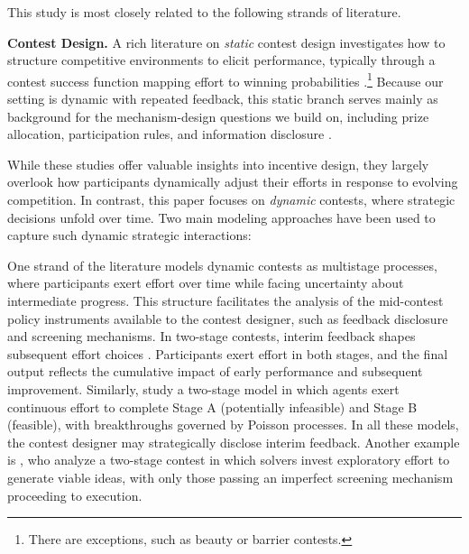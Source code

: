 \documentclass[mnsc]{informs3}
\begin{document}
This study is most closely related to the following strands of literature.

\textbf{Contest Design.}
A rich literature on \textit{static} contest design \citep{ales2017optimal_award} investigates how to structure competitive environments to elicit performance, typically through a contest success function mapping effort to winning probabilities \citep{skaperdas1996contest}.\footnote{There are exceptions, such as beauty or barrier contests.}
Because our setting is dynamic with repeated feedback, this static branch serves mainly as background for the mechanism-design questions we build on, including prize allocation, participation rules, and information disclosure \citep{moldovanu2001optimal, ales2021number_of_players, bergemann2022optimal}.


While these studies offer valuable insights into incentive design, they largely overlook how participants dynamically adjust their efforts in response to evolving competition.
In contrast, this paper focuses on \textit{dynamic} contests, where strategic decisions unfold over time.
Two main modeling approaches have been used to capture such dynamic strategic interactions:

One strand of the literature models dynamic contests as multistage processes, where participants exert effort over time while facing uncertainty about intermediate progress.
This structure facilitates the analysis of the mid-contest policy instruments available to the contest designer, such as feedback disclosure and screening mechanisms.
In two-stage contests, interim feedback shapes subsequent effort choices \citep{aoyagi2010information, mihm2019feedback}.
Participants exert effort in both stages, and the final output reflects the cumulative impact of early performance and subsequent improvement.
Similarly, \citet{bimpikis2019designing} study a two-stage model in which agents exert continuous effort to complete Stage A (potentially infeasible) and Stage B (feasible), with breakthroughs governed by Poisson processes.
In all these models, the contest designer may strategically disclose interim feedback.
Another example is \citet{Khorasani2023screening}, who analyze a two-stage contest in which solvers invest exploratory effort to generate viable ideas, with only those passing an imperfect screening mechanism proceeding to execution.
\end{document}
